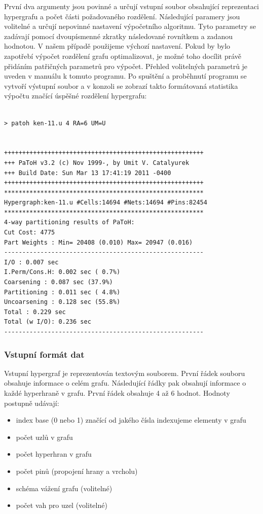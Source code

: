 \documentclass[thesis=M,czech]{FITthesis}[2012/06/26]
\begin{document}
První dva argumenty jsou povinné a určují vstupní soubor obsahující reprezentaci hypergrafu a počet části požadovaného rozdělení. Následující paramery jsou volitelné a určují nepovinné nastavení výpočetního algoritmu.  Tyto parametry se zadávají pomocí dvoupísmenné zkratky následované rovnítkem a zadanou hodnotou. V našem případě použijeme výchozí nastavení. Pokud by bylo zapotřebí výpočet rozdělení grafu optimalizovat, je možné toho docílit právě přidáním patřičných parametrů pro výpočet. Přehled volitelných parametrů je uveden v manuálu k tomuto programu. Po spuštění a proběhnutí programu se vytvoří výstupní soubor a v konzoli se zobrazí takto formátovaná statistika výpočtu značící úspěšné rozdělení hypergrafu:
\medskip
\begin{lstlisting}[frame=single]  % Start your code-block
 
> patoh ken-11.u 4 RA=6 UM=U 
 
 
+++++++++++++++++++++++++++++++++++++++++++++++++++++++
+++ PaToH v3.2 (c) Nov 1999-, by Umit V. Catalyurek
+++ Build Date: Sun Mar 13 17:41:19 2011 -0400
+++++++++++++++++++++++++++++++++++++++++++++++++++++++
*******************************************************
Hypergraph:ken-11.u #Cells:14694 #Nets:14694 #Pins:82454
*******************************************************
4-way partitioning results of PaToH:
Cut Cost: 4775
Part Weights : Min= 20408 (0.010) Max= 20947 (0.016)
-------------------------------------------------------
I/O : 0.007 sec
I.Perm/Cons.H: 0.002 sec ( 0.7%)
Coarsening : 0.087 sec (37.9%)
Partitioning : 0.011 sec ( 4.8%)
Uncoarsening : 0.128 sec (55.8%)
Total : 0.229 sec
Total (w I/O): 0.236 sec
-------------------------------------------------------

\end{lstlisting}
\medskip
\subsubsection{Vstupní formát dat}
Vstupní hypergraf je reprezentován textovým souborem. První řádek souboru obsahuje informace o celém grafu. Následující řádky pak obsahují informace o každé hyperhraně v grafu. První řádek obsahuje 4 až 6 hodnot. Hodnoty postupně udávají:
\begin{itemize}
\item index base (0 nebo 1) značící od jakého čísla indexujeme elementy v grafu
\item počet uzlů v grafu
\item počet hyperhran v grafu
\item počet pinů (propojení hrany a vrcholu)
\item schéma vážení grafu (volitelné)
\item počet vah pro uzel (volitelné)
\end{itemize}
\end{document}
